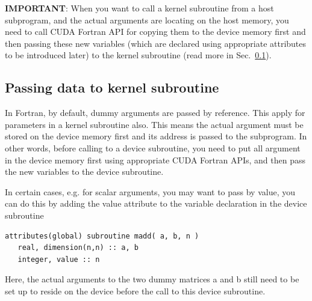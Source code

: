 {\bf IMPORTANT}: When you want to call a kernel subroutine from a host
subprogram, and the actual arguments are locating on the host memory,
you need to call CUDA Fortran API for copying them to the device
memory first and then passing these new variables (which are declared
using appropriate attributes to be introduced later) to the kernel
subroutine (read more in Sec.~\ref{sec:passing-data-kernel}).

\subsection{Passing data to kernel subroutine}
\label{sec:passing-data-kernel}

In Fortran, by default, dummy arguments are passed by reference. This
apply for parameters in a kernel subroutine also. This means the
actual argument must be stored on the device memory first and its
address is passed to the subprogram. In other words, before calling to
a device subroutine, you need to put all argument in the device memory
first using appropriate CUDA Fortran APIs, and then pass the new
variables to the device subroutine.

In certain cases, e.g. for scalar arguments, you may want to pass by
value, you can do this by adding the value attribute to the variable
declaration in the device subroutine
\begin{lstlisting}
attributes(global) subroutine madd( a, b, n )
   real, dimension(n,n) :: a, b
   integer, value :: n
\end{lstlisting}
Here, the actual arguments to the two dummy matrices a and b still
need to be set up to reside on the device before the call to this
device subroutine.


